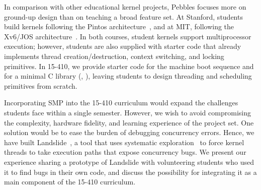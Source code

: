 In comparison with other educational kernel projects,
Pebbles focuses more on ground-up design than on teaching a broad feature set.
At Stanford, students build kernels following the Pintos architecture~\cite{pintos}, and at MIT, following the Xv6/JOS architecture~\cite{xv6}.
In both courses, student kernels support multiprocessor execution;
however, students are also supplied with starter code that already implements thread creation/destruction, context switching, and locking primitives.
In 15-410, we provide starter code for the machine boot sequence and for a minimal C library (, ), leaving students to design threading and scheduling primitives from scratch.

Incorporating SMP into the 15-410 curriculum would expand the challenges students face within a single semester.
However, we wish to avoid compromising the complexity, hardware fidelity, and learning experience of the project set.
One solution would be to ease the burden of debugging concurrency errors.
Hence, we have built Landslide~\cite{landslide}, a tool that uses systematic exploration~\cite{verisoft} to force kernel threads to take execution paths that expose concurrency bugs.
We present our experience sharing a prototype of Landslide with volunteering students who used it to find bugs in their own code, and discuss the possibility for integrating it as a main component of the 15-410 curriculum.


